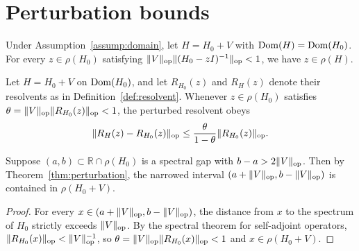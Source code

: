 \section{Perturbation bounds}
\label{sec:results}

\begin{myprop}
\label{prop:stability}
Under Assumption~\ref{assump:domain}, let $H = H_0 + V$ with
$\operatorname{Dom}(H) = \operatorname{Dom}(H_0)$. For every $z \in \rho(H_0)$ satisfying
$\|V\|_{\mathrm{op}} \|(H_0 - zI)^{-1}\|_{\mathrm{op}} < 1$, we have $z \in \rho(H)$.
\end{myprop}

\begin{mythm}
\label{thm:perturbation}
Let $H = H_0 + V$ on $\operatorname{Dom}(H_0)$, and let $R_{H_0}(z)$ and $R_H(z)$ denote
their resolvents as in Definition~\ref{def:resolvent}. Whenever
$z \in \rho(H_0)$ satisfies $\theta = \|V\|_{\mathrm{op}} \|R_{H_0}(z)\|_{\mathrm{op}} < 1$,
the perturbed resolvent obeys
\[
\|R_H(z) - R_{H_0}(z)\|_{\mathrm{op}} \le \frac{\theta}{1 - \theta} \|R_{H_0}(z)\|_{\mathrm{op}}.
\]
\end{mythm}

\begin{mycor}
\label{cor:gap-preserve}
Suppose $(a, b) \subset \mathbb{R} \cap \rho(H_0)$ is a spectral gap with
$b - a > 2 \|V\|_{\mathrm{op}}$. Then by Theorem~\ref{thm:perturbation}, the narrowed
interval $(a + \|V\|_{\mathrm{op}}, b - \|V\|_{\mathrm{op}})$ is contained in $\rho(H_0 + V)$.
\end{mycor}
\begin{proof}
For every $x \in (a + \|V\|_{\mathrm{op}}, b - \|V\|_{\mathrm{op}})$, the distance from $x$ to
the spectrum of $H_0$ strictly exceeds $\|V\|_{\mathrm{op}}$. By the spectral theorem
for self-adjoint operators, $\|R_{H_0}(x)\|_{\mathrm{op}} < \|V\|_{\mathrm{op}}^{-1}$, so
$\theta = \|V\|_{\mathrm{op}}\|R_{H_0}(x)\|_{\mathrm{op}} < 1$ and $x \in \rho(H_0 + V)$.
\end{proof}

